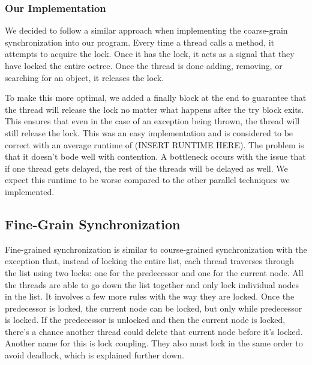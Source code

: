 \documentclass[conference]{IEEEtran}
\begin{document}
\subsubsection{Our Implementation}
We decided to follow a similar approach when implementing the coarse-grain synchronization into our program. Every time a thread calls a method, it attempts to acquire the lock. Once it has the lock, it acts as a signal that they have locked the entire octree. Once the thread is done adding, removing, or searching for an object, it releases the lock. 

To make this more optimal, we added a finally block at the end to guarantee that the thread will release the lock no matter what happens after the try block exits. This ensures that even in the case of an exception being thrown, the thread will still release the lock. This was an easy implementation and is considered to be correct with an average runtime of (INSERT RUNTIME HERE). The problem is that it doesn't bode well with contention. A bottleneck occurs with the issue that if one thread gets delayed, the rest of the threads will be delayed as well. We expect this runtime to be worse compared to the other parallel techniques we implemented.

\subsection{Fine-Grain Synchronization}
Fine-grained synchronization is similar to course-grained synchronization with the exception that, instead of locking the entire list, each thread traverses through the list using two locks: one for the predecessor and one for the current node. All the threads are able to go down the list together and only lock individual nodes in the list. It involves a few more rules with the way they are locked. Once the predecessor is locked, the current node can be locked, but only while predecessor is locked. If the predecessor is unlocked and then the current node is locked, there’s a chance another thread could delete that current node before it’s locked. Another name for this is lock coupling. They also must lock in the same order to avoid deadlock, which is explained further down.\cite{textbook}
\end{document}
